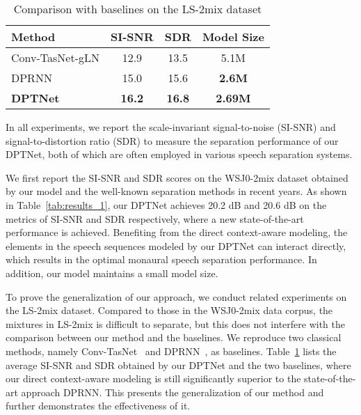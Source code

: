 \documentclass[a4paper]{article}
\begin{document}
\begin{table}[t]
  \caption{Comparison with baselines on the LS-2mix dataset}
  \label{tab:results_2}
  \centering
  \begin{tabular}{lccc}
    \toprule
    \textbf{Method}      & \textbf{SI-SNR}      & \textbf{SDR}      & \textbf{Model Size}\\
    \midrule
    Conv-TasNet-gLN \cite{luo2019conv}             & 12.9            & 13.5            & 5.1M\\
    DPRNN \cite{luo2019dual}                       & 15.0            & 15.6            & \textbf{2.6M}\\
    \midrule
    \textbf{DPTNet}                                & \textbf{16.2}   & \textbf{16.8}   & \textbf{2.69M}\\
    \bottomrule
  \end{tabular}
\end{table}



In all experiments, we report the scale-invariant signal-to-noise (SI-SNR) and signal-to-distortion ratio (SDR) to measure the separation performance of our DPTNet, both of which are often employed in various speech separation systems.


We first report the SI-SNR and SDR scores on the WSJ0-2mix dataset obtained by our model and the well-known separation methods in recent years.
As shown in Table~\ref{tab:results_1}, our DPTNet achieves 20.2 dB and 20.6 dB on the metrics of SI-SNR and SDR respectively, where a new state-of-the-art performance is achieved. Benefiting from the direct context-aware modeling, the elements in the speech sequences modeled by our DPTNet can interact directly, which results in the optimal monaural speech separation performance. In addition, our model maintains a small model size.

To prove the generalization of our approach, we conduct related experiments on the LS-2mix dataset. Compared to those in the WSJ0-2mix data corpus, the mixtures in LS-2mix is difficult to separate, but this does not interfere with the comparison between our method and the baselines. We reproduce two classical methods, namely Conv-TasNet~\cite{luo2019conv} and DPRNN~\cite{luo2019dual}, as baselines. Table~\ref{tab:results_2} lists the average SI-SNR and SDR obtained by our DPTNet and the two baselines, where our direct context-aware modeling is still significantly superior to the state-of-the-art approach DPRNN. This presents the generalization of our method and further demonstrates the effectiveness of it.
\end{document}
